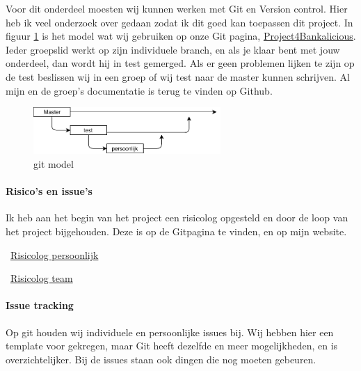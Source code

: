 \documentclass{article}
\begin{document}
Voor dit onderdeel moesten wij kunnen werken met Git en Version control.
Hier heb ik veel onderzoek over gedaan zodat ik dit goed kan toepassen dit project.
In figuur \ref{fig: git model} is het model wat wij gebruiken op onze Git pagina, \href{https://github.com/Gewad/Project4Bankalicious}{Project4Bankalicious}.
Ieder groepslid werkt op zijn individuele branch, en als je klaar bent met jouw onderdeel, dan wordt hij in test gemerged.
Als er geen problemen lijken te zijn op de test beslissen wij in een groep of wij test naar de master kunnen schrijven.
Al mijn en de groep's documentatie is terug te vinden op Github.

\begin{figure}[!h]
        \centering
        \includegraphics[height=0.7in]{git.pdf}
        \caption{git model}
        \label{fig: git model}
\end{figure}

\paragraph{Risico's en issue's}

Ik heb aan het begin van het project een risicolog opgesteld en door de loop van het project bijgehouden.
Deze is op de Gitpagina te vinden, en op mijn website. \\

\vspace{1mm}

\Mundus~\href{https://github.com/Gewad/Project4Bankalicious/blob/test/opdrachten/opdracht_h/opdracht_h_merijn/opdracht_h.pdf}{Risicolog persoonlijk}

\Mundus~\href{https://github.com/Gewad/Project4Bankalicious/blob/test/opdrachten/opdracht_h/opdracht_h_teamonderdeel.xlsx}{Risicolog team}

\paragraph{Issue tracking}

Op git houden wij individuele en persoonlijke issues bij.
Wij hebben hier een template voor gekregen, maar Git heeft dezelfde en meer mogelijkheden, en is overzichtelijker.
Bij de issues staan ook dingen die nog moeten gebeuren. \\ 
\end{document}
